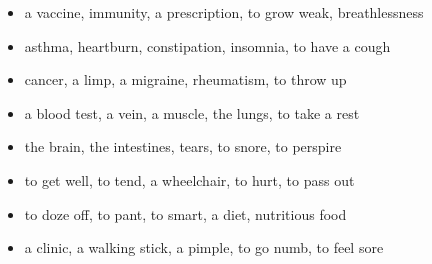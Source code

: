 \begin{itemize}
\raggedright
  \item a vaccine, immunity, a prescription, to grow weak, breathlessness
  \item asthma, heartburn, constipation, insomnia, to have a cough
  \item cancer, a limp, a migraine, rheumatism, to throw up
  \item a blood test, a vein, a muscle, the lungs, to take a rest
  \item the brain, the intestines, tears, to snore, to perspire
  \item to get well, to tend, a wheelchair, to hurt, to pass out
  \item to doze off, to pant, to smart, a diet, nutritious food
  \item a clinic, a walking stick, a pimple, to go numb, to feel sore
\end{itemize}

